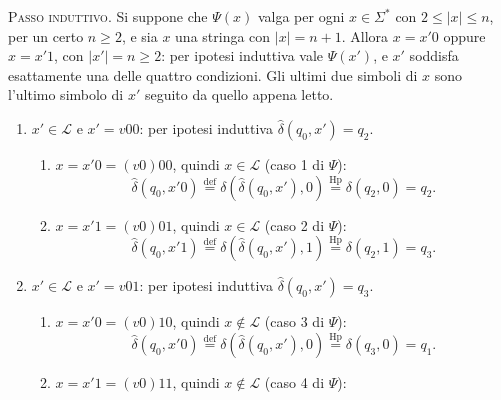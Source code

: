 \documentclass[a4paper, 11pt, oneside]{book}
\theoremstyle{formale}
\begin{document}
    \textsc{Passo induttivo}. Si suppone che $\Psi(x)$ valga per ogni $x \in \Sigma^*$ con
    $2 \leq |x| \leq n$, per un certo $n \geq 2$, e sia $x$ una stringa con
    $|x| = n + 1$. Allora $x = x'0$ oppure $x = x'1$, con $|x'| = n \geq 2$: per ipotesi
    induttiva vale $\Psi(x')$, e $x'$ soddisfa esattamente una delle quattro condizioni.
    Gli ultimi due simboli di $x$ sono l'ultimo simbolo di $x'$ seguito da quello appena
    letto.
    \begin{enumerate}
        \item $x' \in \mathcal{L}$ e $x' = v00$: per ipotesi induttiva
            $\hat{\delta}(q_0, x') = q_2$.
            \begin{enumerate}[label=\arabic{enumi}\alph*.]
                \item $x = x'0 = (v0)00$, quindi $x \in \mathcal{L}$ (caso 1 di $\Psi$):
                    \begin{equation*}
                        \hat{\delta}(q_0, x'0)
                        \overset{\text{def}}{=} \delta(\hat{\delta}(q_0, x'), 0)
                        \overset{\text{Hp}}{=} \delta(q_2, 0) = q_2.
                    \end{equation*}
                \item $x = x'1 = (v0)01$, quindi $x \in \mathcal{L}$ (caso 2 di $\Psi$):
                    \begin{equation*}
                        \hat{\delta}(q_0, x'1)
                        \overset{\text{def}}{=} \delta(\hat{\delta}(q_0, x'), 1)
                        \overset{\text{Hp}}{=} \delta(q_2, 1) = q_3.
                    \end{equation*}
            \end{enumerate}
        \item $x' \in \mathcal{L}$ e $x' = v01$: per ipotesi induttiva
            $\hat{\delta}(q_0, x') = q_3$.
            \begin{enumerate}[label=\arabic{enumi}\alph*.]
                \item $x = x'0 = (v0)10$, quindi $x \notin \mathcal{L}$ (caso 3 di $\Psi$):
                    \begin{equation*}
                        \hat{\delta}(q_0, x'0)
                        \overset{\text{def}}{=} \delta(\hat{\delta}(q_0, x'), 0)
                        \overset{\text{Hp}}{=} \delta(q_3, 0) = q_1.
                    \end{equation*}
                \item $x = x'1 = (v0)11$, quindi $x \notin \mathcal{L}$ (caso 4 di $\Psi$):

\end{enumerate}
\end{enumerate}
\end{document}

